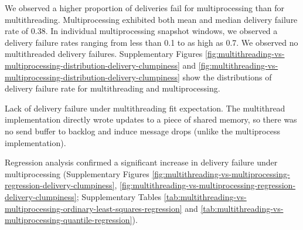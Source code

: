 We observed a higher proportion of deliveries fail for multiprocessing than for multithreading.
Multiprocessing exhibited both mean and median delivery failure rate of 0.38.
In individual multiprocessing snapshot windows, we observed a delivery failure rates ranging from less than 0.1 to as high as 0.7.
We observed no multithreaded delivery failures.
Supplementary Figures \ref{fig:multithreading-vs-multiprocessing-distribution-delivery-clumpiness} and \ref{fig:multithreading-vs-multiprocessing-distribution-delivery-clumpiness} show the distributions of delivery failure rate for multithreading and multiprocessing.

Lack of delivery failure under multithreading fit expectation.
The multithread implementation directly wrote updates to a piece of shared memory, so there was no send buffer to backlog and induce message drops (unlike the multiprocess implementation).

Regression analysis confirmed a significant increase in delivery failure under multiprocessing (Supplementary Figures \ref{fig:multithreading-vs-multiprocessing-regression-delivery-clumpiness}, \ref{fig:multithreading-vs-multiprocessing-regression-delivery-clumpiness}; Supplementary Tables \ref{tab:multithreading-vs-multiprocessing-ordinary-least-squares-regression} and \ref{tab:multithreading-vs-multiprocessing-quantile-regression}).
